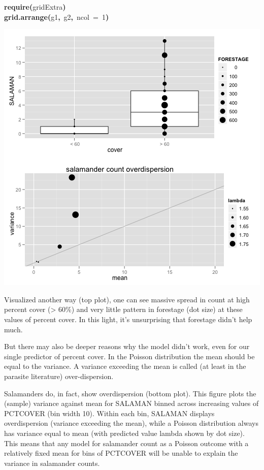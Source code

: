 \documentclass{article}
\makeatletter
\newcommand{\hlnumber}[1]{\textcolor[rgb]{0,0,0}{#1}}%
\newcommand{\hlfunctioncall}[1]{\textcolor[rgb]{.5,0,.33}{\textbf{#1}}}%
\newcommand{\hlkeyword}[1]{\textbf{#1}}%
\newcommand{\hlargument}[1]{\textcolor[rgb]{.69,.25,.02}{#1}}%
\newcommand{\hlsymbol}[1]{#1}%
\newcommand{\hlstd}[1]{\textcolor[rgb]{0,0,0}{#1}}%
\newenvironment{kframe}{%
 \def\FrameCommand##1{\hskip\@totalleftmargin \hskip-\fboxsep
 \colorbox{shadecolor}{##1}\hskip-\fboxsep
     \hskip-\linewidth \hskip-\@totalleftmargin \hskip\columnwidth}%
 \MakeFramed {\advance\hsize-\width
   \@totalleftmargin\z@ \linewidth\hsize
   \@setminipage}}%
 {\par\unskip\endMakeFramed}
\newenvironment{knitrout}{}{} %
\makeatother
\begin{document}
\begin{knitrout}
{\begin{kframe}
\begin{flushleft}
\hlstd{}\hlfunctioncall{require}\hlkeyword{(}\hlsymbol{gridExtra}\hlkeyword{)}\hspace*{\fill}\\
\hlstd{}\hlfunctioncall{grid.arrange}\hlkeyword{(}\hlsymbol{g1}\hlkeyword{,}{\ }\hlsymbol{g2}\hlkeyword{,}{\ }\hlargument{ncol}{\ }\hlargument{=}{\ }\hlnumber{1}\hlkeyword{)}\mbox{}
\normalfont
\end{flushleft}
\includegraphics{cor-issue} \end{kframe}}
\end{knitrout}


Visualized another way (top plot), one can see massive spread in count at high percent cover (> 60\%) and very little pattern in forestage (dot size) at these values of percent cover.
In this light, it's unsurprising that forestage didn't help much. 

But there may also be deeper reasons why the model didn't work, even for our single predictor of percent cover.
In the Poisson distribution the mean should be equal to the variance. 
A variance exceeding the mean is called (at least in the parasite literature) over-dispersion.

Salamanders do, in fact, show overdispersion (bottom plot). 
This figure plots the (sample) variance against mean for SALAMAN binned across increasing values of PCTCOVER (bin width 10).
Within each bin, SALAMAN displays overdispersion (variance exceeding the mean), while a Poisson distribution always has variance equal to mean (with predicted value lambda shown by dot size). 
This means that any model for salamander count as a Poisson outcome with a relatively fixed mean for bins of PCTCOVER will be unable to explain the variance in salamander counts. 
\end{document}

